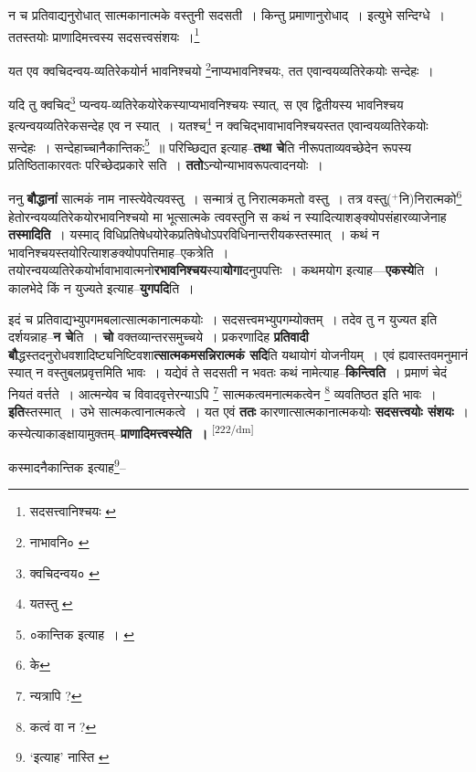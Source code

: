 \documentclass[article,12pt,a4paper]{memoir}
\newcommand{\add}[1]{($^{+}$#1)}
\begin{document}
	न च प्रतिवाद्यनुरोधात् सात्मकानात्मके वस्तुनी सदसती । किन्तु प्रमाणानुरोधाद् । इत्युभे सन्दिग्धे । ततस्तयोः प्राणादिमत्त्वस्य सदसत्त्वसंशयः ।\footnote{सदसत्त्वानिश्चयः \cite{dp-msC}} 
	  
	यत एव क्वचिदन्वय-व्यतिरेकयोर्न भावनिश्चयो \footnote{नाभावनि० \cite{dp-msC}}नाप्यभावनिश्चयः, तत एवान्वयव्यतिरेकयोः सन्देहः । 
	  
	यदि तु क्वचिद\footnote{क्वचिदन्वय० \cite{dp-msC} \cite{dp-msD}} प्यन्वय-व्यतिरेकयोरेकस्याप्यभावनिश्चयः स्यात्, स एव द्वितीयस्य भावनिश्चय इत्यन्वयव्यतिरेकसन्देह एव न स्यात् । यतश्च\footnote{यतस्तु \cite{dp-msC} \cite{dp-msD}} न क्वचिद्भावाभावनिश्चयस्तत एवान्वयव्यतिरेकयोः सन्देहः । सन्देहाच्चानैकान्तिकः\footnote{०कान्तिक इत्याह । \cite{dp-edE}} ॥ परिच्छिद्यत इत्याह--\textbf{तथा चे}ति नीरूपताव्यवच्छेदेन रूपस्य प्रतिष्ठिताकारवतः परिच्छेदप्रकारे सति । \textbf{ततो}ऽन्योन्याभावरूपत्वादनयोः ।
	\pend
      

	  \pstart ननु \textbf{बौद्धानां} सात्मकं नाम नास्त्येवेत्यवस्तु । सन्मात्रं तु निरात्मकमतो वस्तु । तत्र वस्तु\add{नि}निरात्मको\footnote{के} हेतोरन्वयव्यतिरेकयोरभावनिश्चयो मा भूत्सात्मके त्ववस्तुनि स कथं न स्यादित्याशङ्क्योपसंहारव्याजेनाह \textbf{तस्मादिति} । यस्माद् विधिप्रतिषेधयोरेकप्रतिषेधोऽपरविधिनान्तरीयकस्तस्मात् । कथं न भावनिश्चयस्तयोरित्याशङक्योपपत्तिमाह--एकत्रेति । तयोरन्वयव्यतिरेकयोर्भावाभावात्मनो\textbf{रभावनिश्चय}स्या\textbf{योगा}दनुपपत्तिः । कथमयोग इत्याह—\textbf{एकस्ये}ति । कालभेदे किं न युज्यते इत्याह--\textbf{युगपदि}ति ।
	\pend
      

	  \pstart इदं च प्रतिवाद्यभ्युपगमबलात्सात्मकानात्मकयोः । सदसत्त्वमभ्युपगम्योक्तम् । तदेव तु न युज्यत इति दर्शयन्नाह--\textbf{न चे}ति । \textbf{चो} वक्तव्यान्तरसमुच्चये । प्रकरणादिह \textbf{प्रतिवादी बौ}द्धस्तदनुरोधवशादिष्ट्यनिष्टिवशा\textbf{त्सात्मकमसन्निरात्मकं सदि}ति यथायोगं योजनीयम् । एवं ह्यवास्तवमनुमानं स्यात् न वस्तुबलप्रवृत्तमिति भावः । यद्येवं ते सदसती न भवतः कथं नामेत्याह--\textbf{किन्त्विति} । प्रमाणं चेदं नियतं वर्त्तते । आत्मन्येव च विवादवृत्तेरन्याऽपि \footnote{न्यत्रापि ?} सात्मकत्वमनात्मकत्वेन \footnote{कत्वं वा न ?} व्यवतिष्ठत इति भावः । \textbf{इति}स्तस्मात् । उभे सात्मकत्वानात्मकत्वे । यत एवं \textbf{ततः} कारणात्सात्मकानात्मकयोः \textbf{सदसत्त्वयोः संशयः} । कस्येत्याकाङ्क्षायामुक्तम्--\textbf{प्राणादिमत्त्वस्येति ।}
	\pend
      \leavevmode\textsuperscript{\rmlatinfont\tiny [222/dm]}

	  \pstart कस्मादनैकान्तिक इत्याह\footnote{‘इत्याह’ नास्ति \cite{dp-msA} \cite{dp-msB} \cite{dp-msC} \cite{dp-msD} \cite{dp-edP} \cite{dp-edH} \cite{dp-edN}}--
	\pend
       
\end{document}

